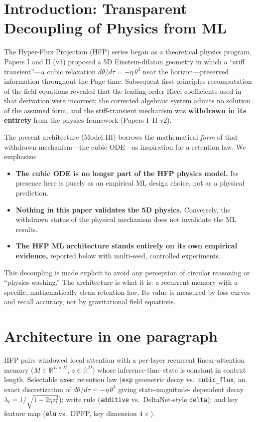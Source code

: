 \documentclass[11pt,a4paper]{article}
\newcommand{\code}[1]{\texttt{#1}}
\begin{document}
\section{Introduction: Transparent Decoupling of Physics from ML}

The Hyper-Flux Projection (HFP) series began as a theoretical physics program. 
Papers I and II (v1) proposed a 5D Einstein-dilaton geometry in which a ``stiff transient''---a cubic relaxation $d\theta/d\tau = -\eta\,\theta^3$ near the horizon---preserved information throughout the Page time. 
Subsequent first-principles recomputation of the field equations revealed that the leading-order Ricci coefficients used in that derivation were incorrect; the corrected algebraic system admits no solution of the assumed form, and the stiff-transient mechanism was \textbf{withdrawn in its entirety} from the physics framework (Papers I--II v2).

The present architecture (Model III) borrows the mathematical \emph{form} of that withdrawn mechanism---the cubic ODE---as inspiration for a retention law. 
We emphasize:

\begin{itemize}
\item \textbf{The cubic ODE is no longer part of the HFP physics model.} Its presence here is purely as an empirical ML design choice, not as a physical prediction.
\item \textbf{Nothing in this paper validates the 5D physics.} Conversely, the withdrawn status of the physical mechanism does not invalidate the ML results.
\item \textbf{The HFP ML architecture stands entirely on its own empirical evidence,} reported below with multi-seed, controlled experiments.
\end{itemize}

\noindent
This decoupling is made explicit to avoid any perception of circular reasoning or ``physics-washing.'' The architecture is what it is: a recurrent memory with a specific, mathematically clean retention law. Its value is measured by loss curves and recall accuracy, not by gravitational field equations.

\section{Architecture in one paragraph}
HFP pairs windowed local attention with a per-layer recurrent linear-attention
memory ($M \in \mathbb{R}^{D\times H}$, $z \in \mathbb{R}^{D}$) whose
inference-time state is constant in context length. Selectable axes:
retention law (\code{exp} geometric decay vs.\ \code{cubic\_flux}, an exact
discretization of $d\theta/d\tau = -\eta\,\theta^{3}$ giving state-magnitude-%
dependent decay $\lambda_t = 1/\sqrt{1+2\eta z_t^{2}}$); write rule
(\code{additive} vs.\ DeltaNet-style \code{delta}); and key feature map
(\code{elu} vs.\ DPFP, key dimension $4\times$).
\end{document}
